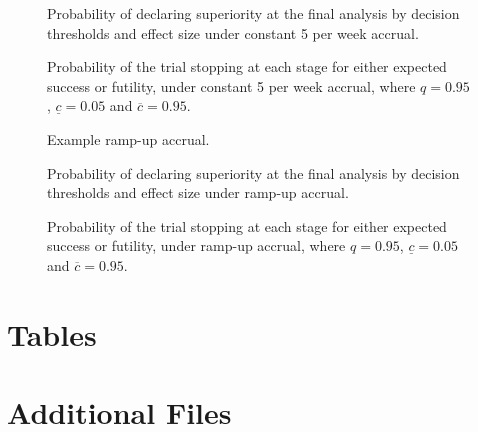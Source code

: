 \documentclass{bmcart}
\begin{document}
\begin{backmatter}
\begin{figure}[!ht]
	\caption{Probability of declaring superiority at the final analysis by decision thresholds and effect size under constant 5 per week accrual.}
	\label{fig:decisions-5}
\end{figure}

\begin{figure}[!ht]
	\caption{Probability of the trial stopping at each stage for either expected success or futility, under constant 5 per week accrual, where \(q=0.95\), \(\underline{c}=0.05\) and \(\overline{c}=0.95\).}\label{fig:stop-5}
\end{figure}

\begin{figure}[!ht] 	  	  	  
	\caption{Example ramp-up accrual.}
	\label{fig:accrual-ru}
\end{figure}

\begin{figure}[!ht]
	\caption{Probability of declaring superiority at the final analysis by decision thresholds and effect size under ramp-up accrual.}
	\label{fig:decisions-ru}
\end{figure}

\begin{figure}[!ht]
	\caption{Probability of the trial stopping at each stage for either expected success or futility, under ramp-up accrual, where \(q=0.95\), \(\underline{c}=0.05\) and \(\overline{c}=0.95\).}\label{fig:stop-ru}
\end{figure}


\section*{Tables}









\section*{Additional Files}

\end{backmatter}
\end{document}
